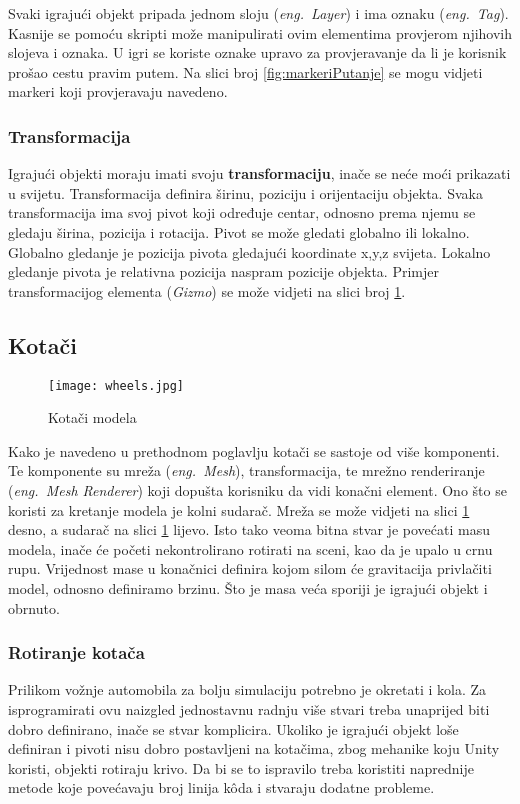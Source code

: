 Svaki igrajući objekt pripada jednom sloju (\emph{eng.~Layer}) i ima oznaku (\emph{eng.~Tag}). Kasnije se pomoću skripti može manipulirati ovim elementima provjerom njihovih slojeva i oznaka. U igri se koriste oznake upravo za provjeravanje da li je korisnik prošao cestu pravim putem. Na slici broj \ref{fig:markeriPutanje} se mogu vidjeti markeri koji provjeravaju navedeno.

\subsubsection{Transformacija}
Igrajući objekti moraju imati svoju \textbf{transformaciju}, inače se neće moći prikazati u svijetu. Transformacija definira širinu, poziciju i orijentaciju objekta. Svaka transformacija ima svoj pivot koji određuje centar, odnosno prema njemu se gledaju širina, pozicija i rotacija. Pivot se može gledati globalno ili lokalno. Globalno gledanje je pozicija pivota gledajući koordinate x,y,z svijeta. Lokalno gledanje pivota je relativna pozicija naspram pozicije objekta. Primjer transformacijog elementa (\emph{Gizmo}) se može vidjeti na slici broj \ref{fig:kotaci}.

\subsection{Kotači}

\begin{figure}[h]
	\texttt{[image: wheels.jpg]}
	\centering
	\caption{Kotači modela}
	\label{fig:kotaci}
\end{figure}

Kako je navedeno u prethodnom poglavlju kotači se sastoje od više komponenti. Te komponente su mreža (\emph{eng.~Mesh}), transformacija, te mrežno renderiranje (\emph{eng.~Mesh Renderer}) koji dopušta korisniku da vidi konačni element. Ono što se koristi za kretanje modela je kolni sudarač. Mreža se može vidjeti na slici \ref{fig:kotaci} desno, a sudarač na slici \ref{fig:kotaci} lijevo. Isto tako veoma bitna stvar je povećati masu modela, inače će početi nekontrolirano rotirati na sceni, kao da je upalo u crnu rupu. Vrijednost mase u konačnici definira kojom silom će gravitacija privlačiti model, odnosno definiramo brzinu. Što je masa veća sporiji je igrajući objekt i obrnuto.

\subsubsection{Rotiranje kotača}
Prilikom vožnje automobila za bolju simulaciju potrebno je okretati i kola. Za isprogramirati ovu naizgled jednostavnu radnju više stvari treba unaprijed biti dobro definirano, inače se stvar komplicira. Ukoliko je igrajući objekt loše definiran i pivoti nisu dobro postavljeni na kotačima, zbog mehanike koju Unity koristi, objekti rotiraju krivo. Da bi se to ispravilo treba koristiti naprednije metode koje povećavaju broj linija k\^oda i stvaraju dodatne probleme. 

